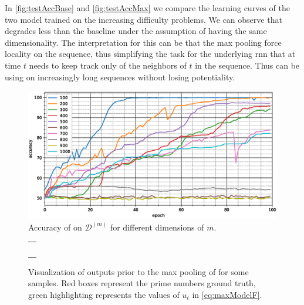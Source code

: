 In \cref{fig:testAccBase} and \cref{fig:testAccMax} we compare
the learning curves of the two model trained on the increasing
difficulty problems. We can observe 
that \maxp{} degrades less than the baseline under the assumption of
having the same dimensionality. The interpretation for this can be
that the max pooling force locality on the sequence, thus simplifying
the task for the underlying \ac{rnn} that at time $t$ needs to keep
track only of the neighbors of $t$ in the sequence. Thus \maxp{} can
be using on increasingly long sequences without losing potentiality.

\begin{figure}
  \centering
  \includegraphics[width=\floatwidth]{imgMax/accuracy-int.eps}
  \caption{Accuracy of \maxi{} on $\mathcal{D}^{(m)}$ for different dimensions of $m$.}
  \label{fig:testAccInt}
\end{figure}

\begin{figure}
  \centering
  \footnotesize
  \begin{tabular}{|p{\floatwidth}|}
    \hline
    \\
    \hline
    \\
    \hline
    \\
    \hline
    \\
    \hline
    \\
    \hline
    \\
    \hline
  \end{tabular}
  \caption{Visualization of outputs prior to the max pooling of
    \maxi{} for some 
    samples. Red boxes represent the prime numbers ground
    truth, green highlighting represents the values of $u_t$ in
    \eqref{eq:maxModelF}.}
  \label{fig:testAttention}
\end{figure}

